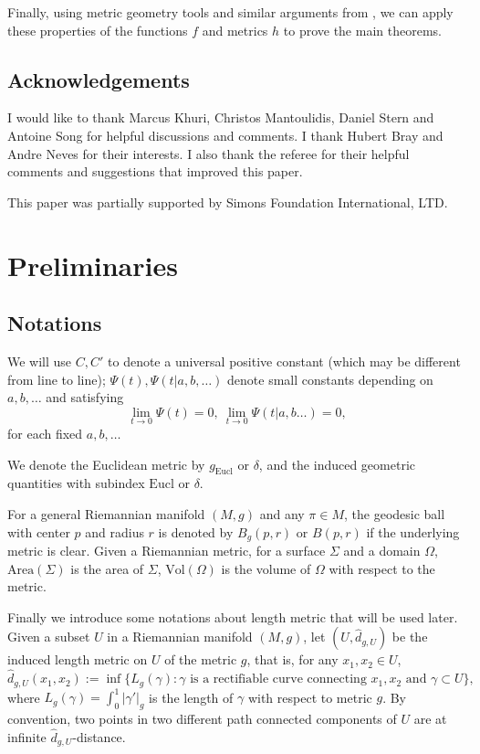 \documentclass[letter]{amsart}
\theoremstyle{definition}
\theoremstyle{remark}
\def\Area{\mathrm{Area}}
\def\Vol{\mathrm{Vol}}
\begin{document}
Finally, using metric geometry tools and similar arguments from \cite[Section 4]{DS'23}, we can apply these properties of the functions $f$ and metrics $h$ to prove the main theorems.


\subsection*{Acknowledgements}
I would like to thank Marcus Khuri, Christos Mantoulidis, Daniel Stern and Antoine Song for helpful discussions and comments. I thank Hubert Bray and Andre Neves for their interests. I also thank the referee for their helpful comments and suggestions that improved this paper.

This paper was partially supported by Simons Foundation International, LTD.

\section{Preliminaries}

\subsection{Notations}
We will use $C, C'$ to denote a universal positive constant (which may be different from line to line); $\Psi (t), \Psi (t|a,b,\ldots)$ denote small constants depending on $a, b, \ldots$ and satisfying 
$$
\lim_{t\to 0} \Psi (t)=0,\ \lim_{t\to 0} \Psi (t|a,b\ldots) =0,
$$ 
for each fixed $a,b,\ldots$

We denote the Euclidean metric by $g_{\mathrm{Eucl}}$ or $\delta $, and the induced geometric quantities with subindex $\mathrm{Eucl}$ or $\delta $.

For a general Riemannian manifold $(M,g)$ and any $\pi \in M$, the geodesic ball with center $p$ and radius $r$ is denoted by $B_g(p,r)$ or $B(p,r)$ if the underlying metric is clear. Given a Riemannian metric, for a surface $\Sigma$ and a domain $\Omega $, $\Area(\Sigma)$ is the area of $\Sigma$, $\Vol(\Omega )$ is the volume of $\Omega $ with respect to the metric.

Finally we introduce some notations about length metric that will be used later.
Given a subset $U$ in a Riemannian manifold $(M,g)$, let $(U, \hat{d}_{g,U})$ be the induced length metric on $U$ of the metric $g$, that is, for any $x_1, x_2 \in U$,
$$
\hat{d}_{g,U}(x_1, x_2):= \inf \{L_g(\gamma ): \gamma \text{ is a rectifiable curve connecting } x_1, x_2 \text{ and } \gamma \subset U\} ,
$$ 
where $L_g(\gamma ) = \int_{0}^{1}|\gamma '|_g$ is the length of $\gamma $ with respect to metric $g$. By convention, two
points in two different path connected components of $U$ are at infinite $\hat{d}_{g, U}$-distance. 
\end{document}
